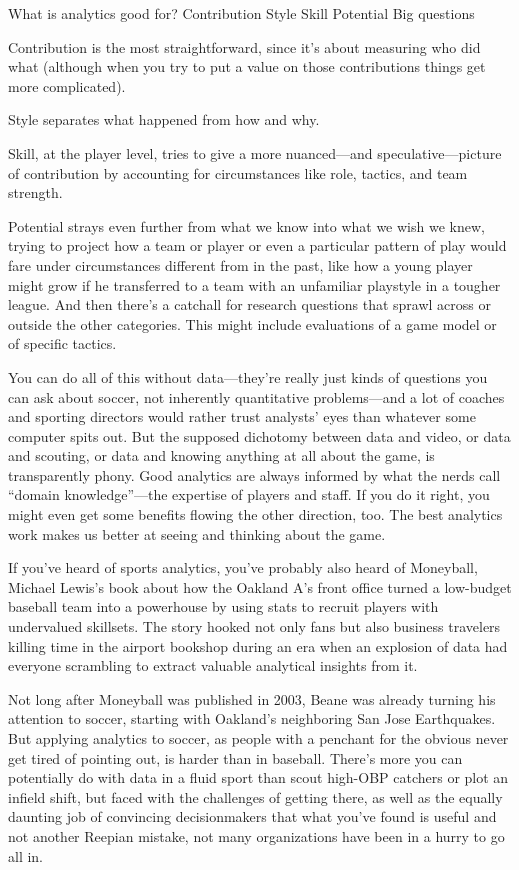 What is analytics good for?
Contribution
Style
Skill
Potential
Big questions

Contribution is the most straightforward, since it’s about measuring who 
did what (although when you try to put a value on those contributions 
things get more complicated). 

Style separates what happened from how and why.

Skill, at the player level, tries to give a more nuanced—and 
speculative—picture of contribution by accounting for circumstances 
like role, tactics, and team strength. 

Potential strays even further from what we know into what we wish we 
knew, trying to project how a team or player or even a particular 
pattern of play would fare under circumstances different from in the 
past, like how a young player might grow if he transferred to a team 
with an unfamiliar playstyle in a tougher league. And then there’s 
a catchall for research questions that sprawl across or outside 
the other categories. This might include evaluations of a game 
model or of specific tactics.

You can do all of this without data—they’re really just kinds 
of questions you can ask about soccer, not inherently quantitative 
problems—and a lot of coaches and sporting directors would rather 
trust analysts’ eyes than whatever some computer spits out. But 
the supposed dichotomy between data and video, or data and scouting, 
or data and knowing anything at all about the game, is transparently 
phony. Good analytics are always informed by what the nerds call 
“domain knowledge”—the expertise of players and staff. If you do it 
right, you might even get some benefits flowing the other direction, too. 
The best analytics work makes us better at seeing and thinking about the game.

If you’ve heard of sports analytics, you’ve probably also heard of Moneyball, 
Michael Lewis’s book about how the Oakland A’s front office turned a 
low-budget baseball team into a powerhouse by using stats to recruit 
players with undervalued skillsets. The story hooked not only fans 
but also business travelers killing time in the airport bookshop 
during an era when an explosion of data had everyone scrambling to 
extract valuable analytical insights from it.

Not long after Moneyball was published in 2003, Beane was already turning 
his attention to soccer, starting with Oakland’s neighboring San Jose 
Earthquakes. But applying analytics to soccer, as people with a penchant 
for the obvious never get tired of pointing out, is harder than in baseball. 
There’s more you can potentially do with data in a fluid sport than scout 
high-OBP catchers or plot an infield shift, but faced with the challenges 
of getting there, as well as the equally daunting job of convincing 
decisionmakers that what you’ve found is useful and not another 
Reepian mistake, not many organizations have been in a hurry to go all in.

